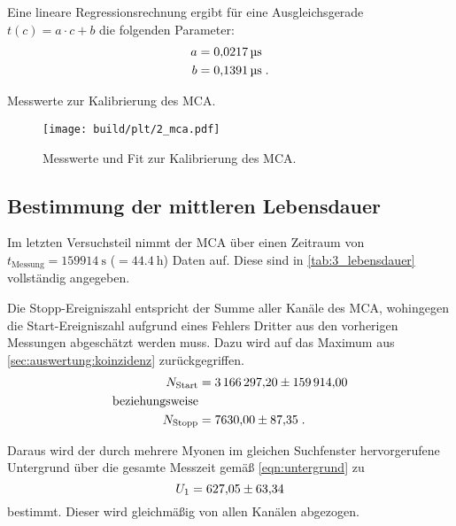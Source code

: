 Eine lineare Regressionsrechnung ergibt
für eine Ausgleichsgerade $t(c) = a \cdot c + b$
die folgenden Parameter:
\begin{align*}
    a &=\SI{0.0217 \pm 0}{\micro\second} \\
    b &=\SI{0.1391 \pm 0}{\micro\second} \; .
\end{align*}

\begin{table}
    \centering
    \caption{Messwerte zur Kalibrierung des \ac{MCA}.}
    \label{tab:2_mca}
\end{table}

\begin{figure}
    \centering
    \texttt{[image: build/plt/2\_mca.pdf]}
    \caption{Messwerte und Fit zur Kalibrierung des \ac{MCA}.}
    \label{fig:plt:2_mca}
\end{figure}


\FloatBarrier
\subsection{Bestimmung der mittleren Lebensdauer} \label{sec:auswertung:lebensdauer}
Im letzten Versuchsteil nimmt der \ac{MCA} über einen Zeitraum von $t_\text{Messung} = \SI{159914}{\second}$ ($= \SI{44.4}{\hour}$) Daten auf.
Diese sind in \autoref{tab:3_lebensdauer} vollständig angegeben.


Die Stopp-Ereigniszahl entspricht der Summe aller Kanäle des \ac{MCA}, %
wohingegen die Start-Ereigniszahl aufgrund eines Fehlers Dritter aus den vorherigen Messungen abgeschätzt werden muss.
Dazu wird auf das Maximum aus \autoref{sec:auswertung:koinzidenz} zurückgegriffen.
\begin{align*}
    N_\text{Start} &= \num{3166297.20 \pm 159914.00} \\
    \text{beziehungsweise} \\
    N_\text{Stopp} &= \num{7630.00 \pm 87.35} \; .
\end{align*}

Daraus wird der durch mehrere Myonen im gleichen Suchfenster hervorgerufene Untergrund über die gesamte Messzeit
gemäß \autoref{eqn:untergrund} zu
\[
    U_1 = \num{627.05 \pm 63.34}
\]
bestimmt.
Dieser wird gleichmäßig von allen Kanälen abgezogen.

